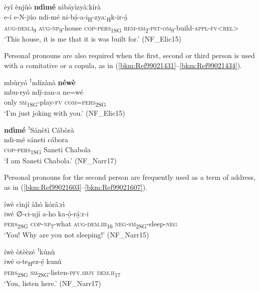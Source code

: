 \ea
\label{bkm:Ref496869707}
èyí ènjûò \textbf{ndìmé} nìbáyìzyàːkírà\\
\gll e-í    e-N-júo ndi-mé  ni-bá̲-a-i\textsubscript{H}-zyaː\textsubscript{H}k-ir-á̲\\
\textsc{aug}-\textsc{dem}.\textsc{i}\textsubscript{9}  \textsc{aug}-\textsc{np}\textsubscript{9}-house \textsc{cop}-\textsc{pers}\textsubscript{1SG}  \textsc{rem}-\textsc{sm}\textsubscript{2}-\textsc{pst}-\textsc{om}\textsubscript{9}-build-\textsc{appl}-\textsc{fv}<\textsc{rel}>\\
\glt ‘This house, it is me that it is was built for.’ (NF\_Elic15)
\z

Personal pronouns are also required when the first, second or third person is used with a comitative or a copula, as in (\ref{bkm:Ref99021431}--\ref{bkm:Ref99021434}).

\ea
\label{bkm:Ref99021431}
mbùryó ꜝndízànà \textbf{néwè}\\
\gll mbu-ryó  ndí̲-zan-a    ne=wé\\
only    \textsc{sm}\textsubscript{1SG}-play-\textsc{fv}  \textsc{com}=\textsc{pers}\textsubscript{2SG}\\
\glt ‘I’m just joking with you.’ (NF\_Elic15)
\z

\ea
\label{bkm:Ref99021434}
\textbf{ndìmé} ꜝSánètì Cábòrà\\
\gll ndi-mé  sáneti  cábora\\
\textsc{cop}-\textsc{pers}\textsubscript{1SG}  Saneti  Chabola\\
\glt ‘I am Saneti Chabola.’ (NF\_Narr17)
\z

Personal pronouns for the second person are frequently used as a term of address, as in (\ref{bkm:Ref99021603}--\ref{bkm:Ref99021607}).

\ea
\label{bkm:Ref99021603}
íwè cìnjí àhò kórâːrì\\
\gll iwé    ∅-ci-njí    a-ho      ka-ó̲-rá̲ːr-i\\
\textsc{pers}\textsubscript{2SG} \textsc{cop}-\textsc{np}\textsubscript{7}-what  \textsc{aug}-\textsc{dem}.\textsc{iii}\textsubscript{16} \textsc{neg}-\textsc{sm}\textsubscript{2SG}-sleep-\textsc{neg}\\
\glt ‘You! Why are you not sleeping!’ (NF\_Narr15)
\z

\ea
\label{bkm:Ref99021607}
íwè òtèèzé ꜝkúnù\\
\gll iwé    o-te\textsubscript{H}ez-é̲      kunú\\
\textsc{pers}\textsubscript{2SG}  \textsc{sm}\textsubscript{2SG}-listen-\textsc{pfv}.\textsc{sbjv}  \textsc{dem}.\textsc{ii}\textsubscript{17}\\
\glt ‘You, listen here.’ (NF\_Narr17)
\z
